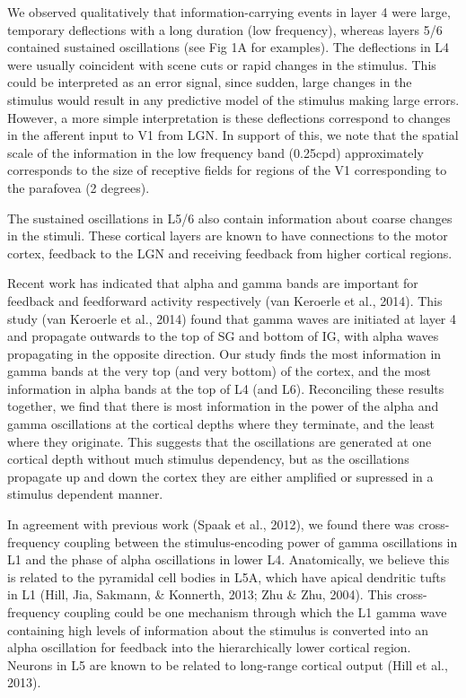 \documentclass{article}
\begin{document}
We observed qualitatively that information-carrying events in layer 4 were large, temporary deflections with a long duration (low frequency), whereas layers 5/6 contained sustained oscillations (see Fig 1A for examples). The deflections in L4 were usually coincident with scene cuts or rapid changes in the stimulus. This could be interpreted as an error signal, since sudden, large changes in the stimulus would result in any predictive model of the stimulus making large errors. However, a more simple interpretation is these deflections correspond to changes in the afferent input to V1 from LGN. In support of this, we note that the spatial scale of the information in the low frequency band (0.25cpd) approximately corresponds to the size of receptive fields for regions of the V1 corresponding to the parafovea (2 degrees).

The sustained oscillations in L5/6 also contain information about coarse changes in the stimuli. These cortical layers are known to have connections to the motor cortex, feedback to the LGN and receiving feedback from higher cortical regions. 

Recent work has indicated that alpha and gamma bands are important for feedback and feedforward activity respectively (van Keroerle et al., 2014). This study (van Keroerle et al., 2014) found that gamma waves are initiated at layer 4 and propagate outwards to the top of SG and bottom of IG, with alpha waves propagating in the opposite direction. Our study finds the most information in gamma bands at the very top (and very bottom) of the cortex, and the most information in alpha bands at the top of L4 (and L6). Reconciling these results together, we find that there is most information in the power of the alpha and gamma oscillations at the cortical depths where they terminate, and the least where they originate. This suggests that the oscillations are generated at one cortical depth without much stimulus dependency, but as the oscillations propagate up and down the cortex they are either amplified or supressed in a stimulus dependent manner.


\bigskip

In agreement with previous work (Spaak et al., 2012), we found there was cross-frequency coupling between the stimulus-encoding power of gamma oscillations in L1 and the phase of alpha oscillations in lower L4. Anatomically, we believe this is related to the pyramidal cell bodies in L5A, which have apical dendritic tufts in L1 (Hill, Jia, Sakmann, \& Konnerth, 2013; Zhu \& Zhu, 2004). This cross-frequency coupling could be one mechanism through which the L1 gamma wave containing high levels of information about the stimulus is converted into an alpha oscillation for feedback into the hierarchically lower cortical region. Neurons in L5 are known to be related to long-range cortical output (Hill et al., 2013). 
\end{document}
